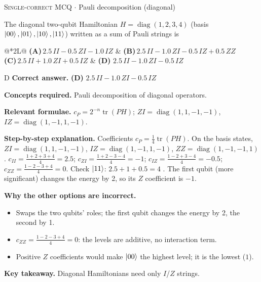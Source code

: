 \documentclass[11pt,a4paper]{article}
\newcommand{\optlabel}[1]{\textbf{(#1)}}
\newcommand{\correctlabel}[1]{\textcolor{okgreen}{\textbf{(#1)}\,\ding{51}}}
\newenvironment{qitem}[1]{\begin{list}{}{\setlength{\leftmargin}{3.3em}\setlength{\labelwidth}{3.1em}%
  \setlength{\labelsep}{0.2em}\setlength{\topsep}{3pt}\setlength{\parsep}{3pt}}\item[\textbf{Q.#1}\hfill]}{\end{list}}
\newcommand{\qsep}{\par\vspace{2pt}{\color{black!15}\hrule}\vspace{4pt}}
\newcommand{\qmeta}[2]{{\footnotesize\color{black!60}\textsc{#1} \;$\cdot$\; #2}\par}
\begin{document}
\begin{qitem}{17}
\qmeta{Single-correct MCQ}{Pauli decomposition (diagonal)}
The diagonal two-qubit Hamiltonian $H = \operatorname{diag}(1, 2, 3, 4)$ (basis $\ket{00}, \ket{01}, \ket{10}, \ket{11}$) written as a sum of Pauli strings is
\par\smallskip\noindent\begin{tabularx}{\linewidth}{@{}*{2}{L}@{}}
\optlabel{A}\,$2.5\,II - 0.5\,ZI - 1.0\,IZ$ & \optlabel{B}\,$2.5\,II - 1.0\,ZI - 0.5\,IZ + 0.5\,ZZ$ \\[3pt]
\optlabel{C}\,$2.5\,II + 1.0\,ZI + 0.5\,IZ$ & \correctlabel{D}\,$2.5\,II - 1.0\,ZI - 0.5\,IZ$
\end{tabularx}
\end{qitem}
\begin{solbox}{D}
\textbf{\color{brand}Correct answer.} \textcolor{okgreen}{\textbf{(D)}} $2.5\,II - 1.0\,ZI - 0.5\,IZ$

\textbf{\color{brand}Concepts required.} Pauli decomposition of diagonal operators.

\textbf{\color{brand}Relevant formulae.} $c_P = 2^{-n}\operatorname{tr}(PH)$; $ZI = \operatorname{diag}(1,1,-1,-1)$, $IZ = \operatorname{diag}(1,-1,1,-1)$.

\textbf{\color{brand}Step-by-step explanation.} Coefficients $c_P = \tfrac14\operatorname{tr}(PH)$. On the basis states, $ZI = \operatorname{diag}(1, 1, -1, -1)$, $IZ = \operatorname{diag}(1, -1, 1, -1)$, $ZZ = \operatorname{diag}(1, -1, -1, 1)$.
$c_{II} = \frac{1+2+3+4}{4} = 2.5$; $c_{ZI} = \frac{1+2-3-4}{4} = -1$; $c_{IZ} = \frac{1-2+3-4}{4} = -0.5$; $c_{ZZ} = \frac{1-2-3+4}{4} = 0$.
Check $\ket{11}$: $2.5 + 1 + 0.5 = 4$ \checkmark{}. The first qubit (more significant) changes the energy by 2, so its $Z$ coefficient is $-1$.

\textbf{\color{brand}Why the other options are incorrect.}
\begin{itemize}[leftmargin=2.4em, itemsep=1pt, topsep=2pt]
\item[\textbf{(A)}] Swaps the two qubits' roles; the first qubit changes the energy by 2, the second by 1.
\item[\textbf{(B)}] $c_{ZZ} = \frac{1 - 2 - 3 + 4}{4} = 0$: the levels are additive, no interaction term.
\item[\textbf{(C)}] Positive $Z$ coefficients would make $\ket{00}$ the highest level; it is the lowest ($1$).
\end{itemize}
\textbf{\color{brand}Key takeaway.} Diagonal Hamiltonians need only $I$/$Z$ strings.
\end{solbox}
\qsep
\end{document}
